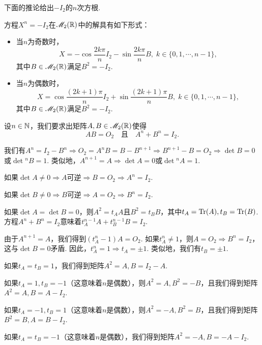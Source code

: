 下面的推论给出$-I_2$的$n$次方根.
\begin{mybox}
  \begin{corollary}[$-I_2$的$n$次方根.]

    方程$X^n=-I_2$在$\mathscr M_2(\mathbb R)$中的解具有如下形式：
    \begin{itemize}
      \item 当$n$为奇数时，
      \[
        X = -\cos\frac{2k\pi}nI_2 - \sin\frac{2k\pi}nB,\; k\in\{0,1,\cdots,n-1\},
      \]
      其中$B\in\mathscr M_2(\mathbb R)$满足$B^2=-I_2$.
      \item 当$n$为偶数时，
      \[
       X = \cos\frac{(2k+1)\pi}nI_2 + \sin\frac{(2k+1)\pi}nB,\;k\in\{0,1,\cdots,n-1\},
      \]
      其中$B\in\mathscr M_2(\mathbb R)$满足$B^2=-I_2$.
    \end{itemize}
  \end{corollary}
\end{mybox}

\begin{example}

  设$n\in\mathbb N$，我们要求出矩阵$A,B\in\mathscr M_2(\mathbb R)$使得
  \[
    AB = O_2 \quad \text{且} \quad A^n + B^n = I_2.
  \]

  我们有$A^n=I_2-B^n\Rightarrow O_2=A^nB=B-B^{n+1}\Rightarrow B^{n+1}-B=O_2
  \Rightarrow\det B=0$或$\det{}^nB=1$. 类似地，$A^{n+1}=A\Rightarrow\det A=0$或$\det{}^nA=1$.

  如果$\det A\ne0\Rightarrow A$可逆$\Rightarrow B=O_2\Rightarrow A^n=I_2$.

  如果$\det B\ne0 \Rightarrow B$可逆$\Rightarrow A=O_2\Rightarrow B^n=I_2$.

  如果$\det A=\det B=0$，则$A^2=t_AA$且$B^2=t_BB$，其中$t_A=\operatorname{Tr}(A),t_B=\operatorname{Tr}(B)$. 方程$A^n+B^n=I_2$意味着$t_A^{n-1}A+t_B^{n-1}B=I_2$.

  由于$A^{n+1}=A$，我们得到$(t_A^n-1)A=O_2$. 如果$t_A^n\ne1$，则$A=O_2\Rightarrow B^n=I_2$，这与$\det B=0$矛盾. 因此，$t_A^n=1\Rightarrow t_A=\pm1$. 类似地，我们有$t_B=\pm1$.

  如果$t_A=t_B=1$，我们得到矩阵$A^2=A,B=I_2-A$.

  如果$t_A=1,t_B=-1$（这意味着$n$是偶数），则$A^2=A,B^2=-B$，且我们得到矩阵$A^2=A,B=A-I_2$.

  如果$t_A=-1,t_B=1$（这意味着$n$是偶数），则$A^2=-A,B^2=B$，且我们得到矩阵$B^2=B,A=B-I_2$.

  如果$t_A=t_B=-1$（这意味着$n$是偶数），我们得到矩阵$A^2=-A,B=-A-I_2$.

\end{example}

